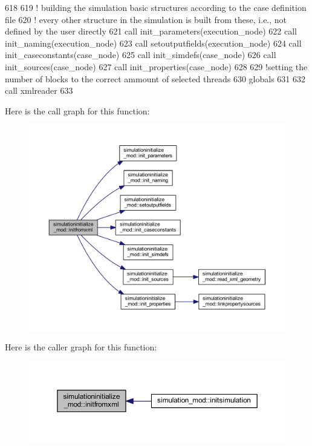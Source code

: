 \begin{DoxyCode}
618 
619     \textcolor{comment}{! building the simulation basic structures according to the case definition file}
620     \textcolor{comment}{! every other structure in the simulation is built from these, i.e., not defined by the user directly}
621     \textcolor{keyword}{call }init\_parameters(execution\_node)
622     \textcolor{keyword}{call }init\_naming(execution\_node)
623     \textcolor{keyword}{call }setoutputfields(execution\_node)
624     \textcolor{keyword}{call }init\_caseconstants(case\_node)
625     \textcolor{keyword}{call }init\_simdefs(case\_node)
626     \textcolor{keyword}{call }init\_sources(case\_node)
627     \textcolor{keyword}{call }init\_properties(case\_node)    
628 
629     \textcolor{comment}{!setting the number of blocks to the correct ammount of selected threads}
630     globals%
631 
632     \textcolor{keyword}{call }xmlreader%
633 
\end{DoxyCode}
Here is the call graph for this function\+:\nopagebreak
\begin{figure}[H]
\begin{center}
\leavevmode
\includegraphics[width=350pt]{namespacesimulationinitialize__mod_ada0310fe0d45fa2eec30deaf3ad25ba7_cgraph}
\end{center}
\end{figure}
Here is the caller graph for this function\+:\nopagebreak
\begin{figure}[H]
\begin{center}
\leavevmode
\includegraphics[width=350pt]{namespacesimulationinitialize__mod_ada0310fe0d45fa2eec30deaf3ad25ba7_icgraph}
\end{center}
\end{figure}
